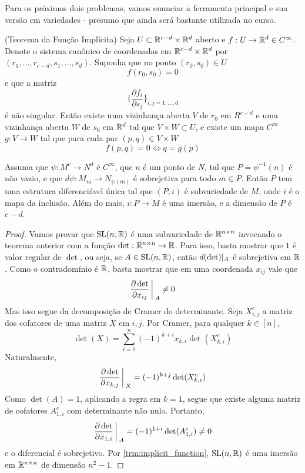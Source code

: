 Para os próximos dois problemas, vamos enunciar a ferramenta principal e sua versão em variedades - presumo que ainda será bastante 
utilizada no curso.
\begin{theorem}
    (Teorema da Função Implícita) Seja $U \subset \mathbb{R}^{c -d}\times \mathbb{R}^d$ aberto e $f: U \rightarrow \mathbb{R}^d \in C^\infty$. Denote o sistema canônico de coordenadas em
    $\mathbb{R}^{c -d}\times \mathbb{R}^d$ por $(r_1, \dots, r_{c-d}, s_1, \dots, s_d)$. Suponha que no ponto $(r_0,s_0) \in U$
    $$f(r_0, s_0) = 0$$
    e que a matriz
    $$\bigg\{\frac{\partial f_i}{\partial s_j}\bigg\}_{i,j = 1,\dots,d}$$
    é não singular. Então existe uma vizinhança aberta $V$ de $r_0$ em $R^{c-d}$ e uma vizinhança aberta $W$ de $s_0$ em $\mathbb{R}^d$
    tal que $V \times W \subset U$, e existe um mapa $C^\infty$ $g:V\to W$ tal que para cada par $(p,q) \in V\times W$
    $$f(p,q) = 0 \iff q = g(p)$$ 
\end{theorem}

\begin{theorem}
    \label{trm:implicit_function}
    Assuma que $\psi: M^c \to N^d$ é $C^\infty$, que $n$ é um ponto de $N$, tal que $P = \psi^{-1}(n)$ é não vazio, e 
    que $d\psi: M_m \to N_{\psi(m)}$ é sobrejetiva para todo $m \in P$. Então $P$ tem uma estrutura diferenciável única
    tal que $(P,i)$ é subvariedade de $M$, onde $i$ é o mapa da inclusão. Além do mais, $i : P \to M$ é uma imersão, e a dimensão
    de $P$ é $c - d$.
\end{theorem}

\begin{problem}
    \label{prob:l2:3} 
\end{problem}
\begin{proof}
    Vamos provar que $\text{SL}(n,\mathbb{R})$ é uma subvariedade de $\mathbb{R}^{n\times n}$ invocando o teorema anterior com a função $\det : \mathbb{R}^{n\times n} \rightarrow \mathbb{R}$.
    Para isso, basta mostrar que $1$ é valor regular de $\det$, ou seja, se $A \in \text{SL}(n,\mathbb{R})$, então $d(\det)\arrowvert_A$ é sobrejetiva em $\mathbb{R}$.
    Como o contradomínio é $\mathbb{R}$, basta mostrar que em uma coordenada $x_{ij}$ vale que 
    $$\frac{\partial \det}{\partial x_{ij}}\bigg\arrowvert_A \neq 0$$
    Mas isso segue da decomposição de Cramer do determinante. Seja $X_{i,j}^c$ a matriz dos cofatores de uma matriz $X$ em $i,j$. Por Cramer, para qualquer $k \in [n]$,
    \begin{equation}
        \det(X) = \sum_{i = 1}^n (-1)^{k+i} x_{k,i} \det(X_{k,i}^c)
    \end{equation}
    Naturalmente,
    $$\frac{\partial \det}{\partial x_{k,j}}\bigg\arrowvert_X = (-1)^{k+j} \det(X_{k,i}^c)$$
    Como $\det(A) = 1$, aplicando a regra em $k = 1$, segue que existe alguma matriz de cofatores $A_{1,i}^c$ com determinante
    não nulo. Portanto,
    $$\frac{\partial \det}{\partial x_{1,i}}\bigg\arrowvert_A = (-1)^{1+i} \det(A_{1,i}^c) \neq 0$$
    e o diferencial é sobrejetivo. Por \ref{trm:implicit_function}, $\text{SL}(n,\mathbb{R})$ é uma imersão em $\mathbb{R}^{n\times n}$ de dimensão 
    $n^2 - 1$.
\end{proof}


